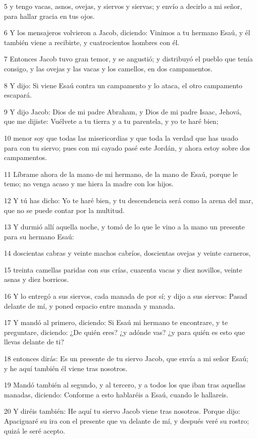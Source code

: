 5 y tengo vacas, asnos, ovejas, y siervos y siervas; y envío a decirlo a mi señor, para hallar gracia en tus ojos.

6 Y los mensajeros volvieron a Jacob, diciendo: Vinimos a tu hermano Esaú, y él también viene a recibirte, y cuatrocientos hombres con él.

7 Entonces Jacob tuvo gran temor, y se angustió; y distribuyó el pueblo que tenía consigo, y las ovejas y las vacas y los camellos, en dos campamentos.

8 Y dijo: Si viene Esaú contra un campamento y lo ataca, el otro campamento escapará.

9 Y dijo Jacob: Dios de mi padre Abraham, y Dios de mi padre Isaac, Jehová, que me dijiste: Vuélvete a tu tierra y a tu parentela, y yo te haré bien;

10 menor soy que todas las misericordias y que toda la verdad que has usado para con tu siervo; pues con mi cayado pasé este Jordán, y ahora estoy sobre dos campamentos.

11 Líbrame ahora de la mano de mi hermano, de la mano de Esaú, porque le temo; no venga acaso y me hiera la madre con los hijos.

12 Y tú has dicho: Yo te haré bien, y tu descendencia será como la arena del mar, que no se puede contar por la multitud.

13 Y durmió allí aquella noche, y tomó de lo que le vino a la mano un presente para su hermano Esaú:

14 doscientas cabras y veinte machos cabríos, doscientas ovejas y veinte carneros,

15 treinta camellas paridas con sus crías, cuarenta vacas y diez novillos, veinte asnas y diez borricos.

16 Y lo entregó a sus siervos, cada manada de por sí; y dijo a sus siervos: Pasad delante de mí, y poned espacio entre manada y manada.

17 Y mandó al primero, diciendo: Si Esaú mi hermano te encontrare, y te preguntare, diciendo: ¿De quién eres? ¿y adónde vas? ¿y para quién es esto que llevas delante de ti?

18 entonces dirás: Es un presente de tu siervo Jacob, que envía a mi señor Esaú; y he aquí también él viene tras nosotros.

19 Mandó también al segundo, y al tercero, y a todos los que iban tras aquellas manadas, diciendo: Conforme a esto hablaréis a Esaú, cuando le hallareis.

20 Y diréis también: He aquí tu siervo Jacob viene tras nosotros. Porque dijo: Apaciguaré su ira con el presente que va delante de mí, y después veré su rostro; quizá le seré acepto.

